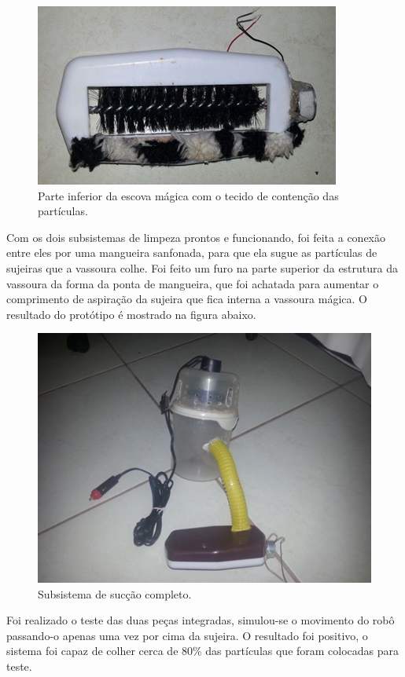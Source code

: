 		\begin{figure}[H]
			\centering
			\includegraphics[scale=1]{figuras/asppc2_12.jpg}
			\caption{Parte inferior da escova mágica com o tecido de contenção das partículas.}
			\label{img:escova_com_tecido}
		\end{figure}

		Com os dois subsistemas de limpeza prontos e funcionando, foi feita a conexão entre eles por uma mangueira sanfonada, para que ela sugue as partículas de sujeiras que a vassoura colhe. Foi feito um furo na parte superior da estrutura da vassoura da forma da ponta de mangueira, que foi achatada para aumentar o comprimento de aspiração da sujeira que fica interna a vassoura mágica. O resultado do protótipo é mostrado na figura abaixo.

		\begin{figure}[H]
			\centering
			\includegraphics[scale=1]{figuras/asppc2_13.jpg}
			\caption{Subsistema de sucção completo.}
			\label{img:sistema_completo}
		\end{figure}

		Foi realizado o teste das duas peças integradas, simulou-se o movimento do robô passando-o apenas uma vez por cima da sujeira. O resultado foi positivo, o sistema foi capaz de colher cerca de 80\% das partículas que foram colocadas para teste.
